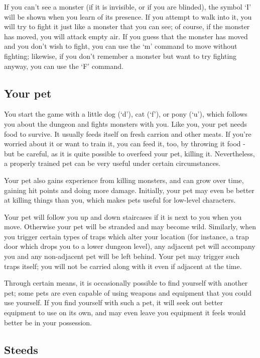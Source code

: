 If you can't see a monster (if it is invisible, or if you are blinded),
the symbol `I' will be shown when you learn of its presence.
If you attempt to walk into it, you will try to fight it just like
a monster that you can see; of course,
if the monster has moved, you will attack empty air.  If you guess
that the monster has moved and you don't wish to fight, you can use the `m'
command to move without fighting; likewise, if you don't remember a monster
but want to try fighting anyway, you can use the `F' command.
\subsection*{Your pet}

You start the game with a little dog (`d'), cat (`f'), or pony (`u'), which
follows you about the dungeon and fights monsters with you.  Like you, your
pet needs food to survive.  It usually feeds itself on fresh carrion
and other meats.  If you're worried about it or want to train it, you
can feed it, too, by throwing it food - but be careful, as it is quite
possible to overfeed your pet, killing it. Nevertheless, a properly trained
pet can be very useful under certain circumstances.

Your pet also gains experience from killing monsters, and can grow
over time, gaining hit points and doing more damage.  Initially, your
pet may even be better at killing things than you, which makes pets
useful for low-level characters.

Your pet will follow you up and down staircases if it is next to you
when you move.  Otherwise your pet will be stranded and may become
wild.  Similarly, when you trigger certain types of traps which alter
your location (for instance, a trap door which drops you to a lower
dungeon level), any adjacent pet will accompany you and any non-adjacent
pet will be left behind.  Your pet may trigger such traps itself; you
will not be carried along with it even if adjacent at the time.

Through certain means, it is occasionally possible to find yourself with
another pet; some pets are even capable of using weapons and equipment
that you could use yourself.  If you find yourself with such a pet, it
will seek out better equipment to use on its own, and may even leave
you equipment it feels would better be in your possession.
\subsection*{Steeds}

